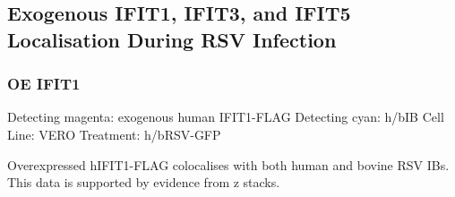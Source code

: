 \subsection{Exogenous IFIT1, IFIT3, and IFIT5 Localisation  During RSV Infection} \label{subsec:Exogenous IFIT1, IFIT3, and IFIT5 Localisation  During RSV Infection}
\subsubsection{OE IFIT1}
Detecting magenta: exogenous human IFIT1-FLAG \newline
Detecting cyan: h/bIB \newline
Cell Line: VERO \newline
Treatment: h/bRSV-GFP \newline

Overexpressed hIFIT1-FLAG colocalises with both human and bovine RSV IBs. This data is supported by evidence from z stacks.

